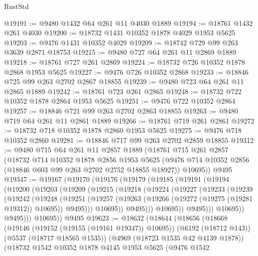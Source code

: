 \begin{lexlean}{RustStd}
\begin{coremodule}
@19191 := @9480 @1432 @64 @261 @11 @4030 @1889
@19194 := @18761 @1432 @261 @4030
@19200 := @18732 @1431 @10352 @1878 @4029 @1953 @5625
@19203 := @9476 @1431 @10352 @4029
@19209 := @18742 @729 @99 @263 @3639 @2871 @18753
@19215 := @9480 @727 @64 @261 @11 @2869 @1889
@19218 := @18761 @727 @261 @2869
@19224 := @18732 @726 @10352 @1878 @2868 @1953 @5625
@19227 := @9476 @726 @10352 @2868
@19233 := @18846 @725 @99 @263 @2702 @2867 @18855
@19239 := @9480 @723 @64 @261 @11 @2865 @1889
@19242 := @18761 @723 @261 @2865
@19248 := @18732 @722 @10352 @1878 @2864 @1953 @5625
@19251 := @9476 @722 @10352 @2864
@19257 := @18846 @721 @99 @263 @2702 @2863 @18855
@19263 := @9480 @719 @64 @261 @11 @2861 @1889
@19266 := @18761 @719 @261 @2861
@19272 := @18732 @718 @10352 @1878 @2860 @1953 @5625
@19275 := @9476 @718 @10352 @2860
@19281 := @18846 @717 @99 @263 @2702 @2859 @18855
@19312 := @9480
    @715
    @64
    @261
    @11
    @2857
    @1889
    (@18761
      @715
      @261
      @2857
      (@18732
        @714
        @10352
        @1878
        @2856
        @1953
        @5625
        (@9476 @714 @10352 @2856 (@18846 @603 @99 @263 @2702 @2752 @18855 @18927))
        @10695))
    @9495
@19347 := @19167
    (@19170
      (@19176
        (@19179
          (@19185
            (@19191
              (@19194
                (@19200
                  (@19203
                    (@19209
                      (@19215
                        (@19218
                          (@19224
                            (@19227
                              (@19233
                                (@19239
                                  (@19242
                                    (@19248
                                      (@19251
                                        (@19257
                                          (@19263
                                            (@19266 (@19272 (@19275 (@19281 @19312)) @10695))
                                            @9495)))
                                      @10695))
                                  @9495)))
                            @10695))
                        @9495)))
                  @10695))
              @9495)))
        @10695))
    @9495
@19623 := @18632
    (@18644
      (@18656
        (@18668
          (@19146 (@19152 (@19155 (@19161 @19347)) @10695))
          (@6192 (@18712 @143))
          (@5537 (@18717 @18565 @1535))
          (@4969 (@18723 @1535 @42 @4139 @1878))
          (@18732
            @1542
            @10352
            @1878
            @4145
            @1953
            @5625
            (@9476
              @1542

\end{coremodule}
\end{lexlean}
